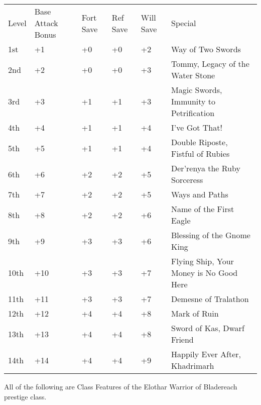 \begin{table}[tbh]
\begin{small}
\begin{tabular}{lp{1.9cm}p{0.7cm}p{0.7cm}p{0.7cm}l}
Level &Base Attack Bonus &Fort Save &Ref Save &Will Save &Special\\
1st &+1 &+0 &+0 &+2 &Way of Two Swords\\
2nd &+2 &+0 &+0 &+3 &Tommy, Legacy of the Water Stone\\
3rd &+3 &+1 &+1 &+3 &Magic Swords, Immunity to Petrification\\
4th &+4 &+1 &+1 &+4 &I've Got That!\\
5th &+5 &+1 &+1 &+4 &Double Riposte, Fistful of Rubies\\
6th &+6 &+2 &+2 &+5 &Der'renya the Ruby Sorceress\\
7th &+7 &+2 &+2 &+5 &Ways and Paths\\
8th &+8 &+2 &+2 &+6 &Name of the First Eagle\\
9th &+9 &+3 &+3 &+6 &Blessing of the Gnome King\\
10th &+10 &+3 &+3 &+7 &Flying Ship, Your Money is No Good Here\\
11th &+11 &+3 &+3 &+7 &Demesne of Tralathon\\
12th &+12 &+4 &+4 &+8 &Mark of Ruin\\
13th &+13 &+4 &+4 &+8 &Sword of Kas, Dwarf Friend\\
14th &+14 &+4 &+4 &+9 &Happily Ever After, Khadrimarh\\
\end{tabular}
\end{small}
\end{table}


\smallskip\noindent All of the following are Class Features of the Elothar Warrior of Bladereach prestige class.




